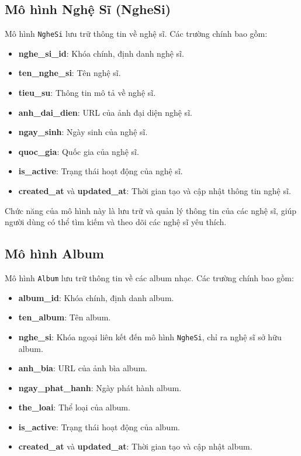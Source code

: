 \subsection{Mô hình Nghệ Sĩ (NgheSi)}
Mô hình \texttt{NgheSi} lưu trữ thông tin về nghệ sĩ. Các trường chính bao gồm:
\begin{itemize}
    \item \textbf{nghe\_si\_id}: Khóa chính, định danh nghệ sĩ.
    \item \textbf{ten\_nghe\_si}: Tên nghệ sĩ.
    \item \textbf{tieu\_su}: Thông tin mô tả về nghệ sĩ.
    \item \textbf{anh\_dai\_dien}: URL của ảnh đại diện nghệ sĩ.
    \item \textbf{ngay\_sinh}: Ngày sinh của nghệ sĩ.
    \item \textbf{quoc\_gia}: Quốc gia của nghệ sĩ.
    \item \textbf{is\_active}: Trạng thái hoạt động của nghệ sĩ.
    \item \textbf{created\_at} và \textbf{updated\_at}: Thời gian tạo và cập nhật thông tin nghệ sĩ.
\end{itemize}

Chức năng của mô hình này là lưu trữ và quản lý thông tin của các nghệ sĩ, giúp người dùng có thể tìm kiếm và theo dõi các nghệ sĩ yêu thích.

\subsection{Mô hình Album}
Mô hình \texttt{Album} lưu trữ thông tin về các album nhạc. Các trường chính bao gồm:
\begin{itemize}
    \item \textbf{album\_id}: Khóa chính, định danh album.
    \item \textbf{ten\_album}: Tên album.
    \item \textbf{nghe\_si}: Khóa ngoại liên kết đến mô hình \texttt{NgheSi}, chỉ ra nghệ sĩ sở hữu album.
    \item \textbf{anh\_bia}: URL của ảnh bìa album.
    \item \textbf{ngay\_phat\_hanh}: Ngày phát hành album.
    \item \textbf{the\_loai}: Thể loại của album.
    \item \textbf{is\_active}: Trạng thái hoạt động của album.
    \item \textbf{created\_at} và \textbf{updated\_at}: Thời gian tạo và cập nhật album.
\end{itemize}

